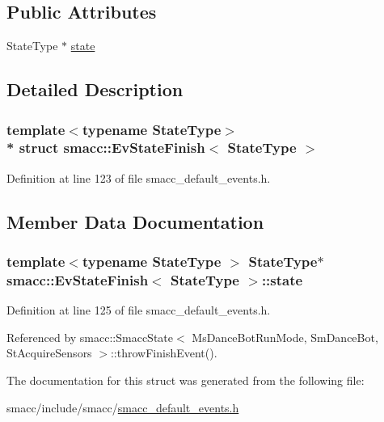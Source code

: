 \subsection*{Public Attributes}
\begin{DoxyCompactItemize}
\item 
State\+Type $\ast$ \hyperlink{structsmacc_1_1EvStateFinish_aa3a3ee44e35e32c7b803926331cb164d}{state}
\end{DoxyCompactItemize}


\subsection{Detailed Description}
\subsubsection*{template$<$typename State\+Type$>$\\*
struct smacc\+::\+Ev\+State\+Finish$<$ State\+Type $>$}



Definition at line 123 of file smacc\+\_\+default\+\_\+events.\+h.



\subsection{Member Data Documentation}
\subsubsection[{\texorpdfstring{state}{state}}]{\setlength{\rightskip}{0pt plus 5cm}template$<$typename State\+Type $>$ State\+Type$\ast$ {\bf smacc\+::\+Ev\+State\+Finish}$<$ State\+Type $>$\+::state}\hypertarget{structsmacc_1_1EvStateFinish_aa3a3ee44e35e32c7b803926331cb164d}{}\label{structsmacc_1_1EvStateFinish_aa3a3ee44e35e32c7b803926331cb164d}


Definition at line 125 of file smacc\+\_\+default\+\_\+events.\+h.



Referenced by smacc\+::\+Smacc\+State$<$ Ms\+Dance\+Bot\+Run\+Mode, Sm\+Dance\+Bot, St\+Acquire\+Sensors $>$\+::throw\+Finish\+Event().



The documentation for this struct was generated from the following file\+:\begin{DoxyCompactItemize}
\item 
smacc/include/smacc/\hyperlink{smacc__default__events_8h}{smacc\+\_\+default\+\_\+events.\+h}\end{DoxyCompactItemize}
